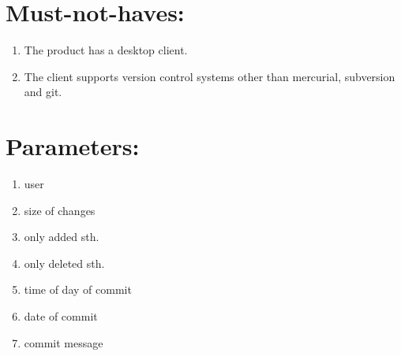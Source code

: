\documentclass[10pt]{scrartcl}
\begin{document}
\section{Must-not-haves:}
\begin{enumerate}
\item The product has a desktop client.
\item The client supports version control systems other than mercurial, subversion and git.
\end{enumerate}
\section{Parameters:}
\begin{enumerate}
\item user
\item size of changes
\item only added sth.
\item only deleted sth.
\item time of day of commit
\item date of commit
\item commit message
\end{enumerate}
\end{document}
